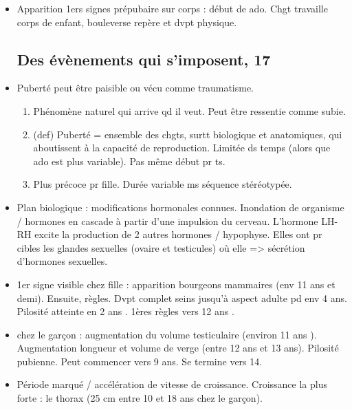 \documentclass[12pt]{report}
\begin{document}
\begin{itemize}
\item Apparition 1ers signes prépubaire sur corps : début de ado. Chgt travaille corps de enfant, bouleverse repère et dvpt physique.

\subsection{Des évènements qui s'imposent, 17}
\item Puberté peut être paisible ou vécu comme traumatisme. 
\begin{enumerate}
\item Phénomène naturel qui arrive qd il veut. Peut être ressentie comme subie.\\
\item (def) Puberté = ensemble des chgts, surtt biologique et anatomiques, qui aboutissent à la capacité de reproduction. Limitée ds temps (alors que ado est plus variable). Pas même début pr ts. \\
\item Plus précoce pr fille. Durée variable ms  séquence stéréotypée. \\
\end{enumerate}

\item Plan biologique : modifications hormonales connues. Inondation de organisme / hormones en cascade à partir d'une impulsion du cerveau.  L'hormone LH-RH excite la production de 2 autres hormones / hypophyse. Elles ont pr cibles les glandes sexuelles (ovaire et testicules) où elle => sécrétion d'hormones sexuelles. \\

\item 1er signe visible chez fille : apparition bourgeons mammaires (env 11 ans et demi). Ensuite, règles. Dvpt complet seins jusqu'à aspect adulte pd env 4 ans. Pilosité atteinte en 2 ans . 1ères règles vers 12 ans . \\

\item chez le garçon : augmentation du volume testiculaire (environ 11 ans ). Augmentation longueur et volume de verge (entre 12 ans  et 13 ans). Pilosité pubienne. Peut commencer vers 9 ans. Se termine vers 14. \\

\item Période marqué / accélération de vitesse de croissance. Croissance la plus forte : le thorax (25 cm entre 10 et 18 ans chez le garçon).


\end{itemize}
\end{document}
